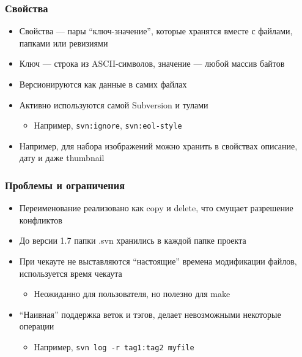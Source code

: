 \documentclass{../cscslides}
\begin{document}
    \begin{frame}[fragile]
        \frametitle{Свойства}
        \begin{itemize}
            \item Свойства --- пары ``ключ-значение'', которые хранятся вместе с файлами, папками или ревизиями
            \item Ключ --- строка из ASCII-символов, значение --- любой массив байтов
            \item Версионируются как данные в самих файлах
            \item Активно используются самой Subversion и тулами
            \begin{itemize}
                \item Например, \verb|svn:ignore|, \verb|svn:eol-style|
            \end{itemize}
            \item Например, для набора изображений можно хранить в свойствах описание, дату и даже thumbnail
        \end{itemize}
    \end{frame}

    \begin{frame}[fragile]
        \frametitle{Проблемы и ограничения}
        \begin{itemize}
            \item Переименование реализовано как copy и delete, что смущает разрешение конфликтов
            \item До версии 1.7 папки .svn хранились в каждой папке проекта
            \item При чекауте не выставляются ``настоящие'' времена модификации файлов, используется время чекаута
            \begin{itemize}
                \item Неожиданно для пользователя, но полезно для make
            \end{itemize}
            \item ``Наивная'' поддержка веток и тэгов, делает невозможными некоторые операции
            \begin{itemize}
                \item Например, \verb|svn log -r tag1:tag2 myfile|
            \end{itemize}
        \end{itemize}
    \end{frame}
\end{document}
